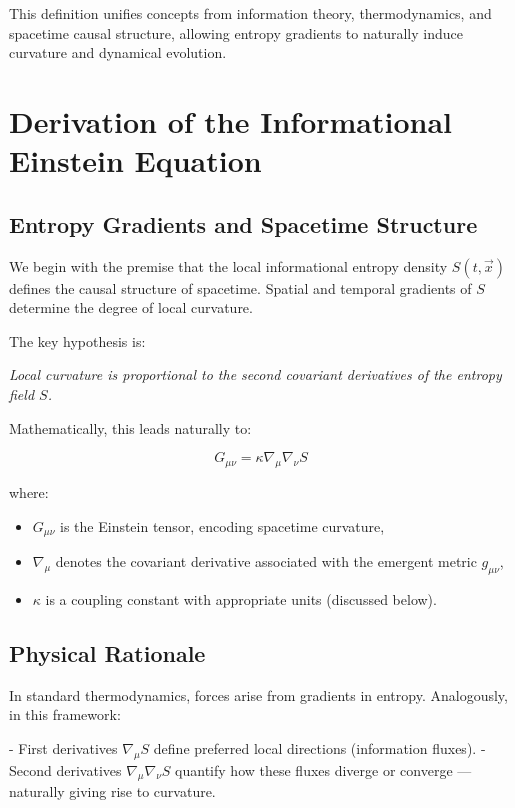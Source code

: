 \documentclass{article}
\begin{document}
This definition unifies concepts from information theory, thermodynamics, and spacetime causal structure, allowing entropy gradients to naturally induce curvature and dynamical evolution.

\section{Derivation of the Informational Einstein Equation}

\subsection{Entropy Gradients and Spacetime Structure}

We begin with the premise that the local informational entropy density $S(t, \vec{x})$ defines the causal structure of spacetime.
Spatial and temporal gradients of $S$ determine the degree of local curvature.

The key hypothesis is:

\textit{Local curvature is proportional to the second covariant derivatives of the entropy field $S$.}

Mathematically, this leads naturally to:

\begin{equation}
G_{\mu\nu} = \kappa \nabla_\mu \nabla_\nu S
\label{eq:InformationalEinstein}
\end{equation}

where:
\begin{itemize}
    \item $G_{\mu\nu}$ is the Einstein tensor, encoding spacetime curvature,
    \item $\nabla_\mu$ denotes the covariant derivative associated with the emergent metric $g_{\mu\nu}$,
    \item $\kappa$ is a coupling constant with appropriate units (discussed below).
\end{itemize}

\subsection{Physical Rationale}

In standard thermodynamics, forces arise from gradients in entropy.
Analogously, in this framework:

- First derivatives $\nabla_\mu S$ define preferred local directions (information fluxes).
- Second derivatives $\nabla_\mu \nabla_\nu S$ quantify how these fluxes diverge or converge — naturally giving rise to curvature.
\end{document}
